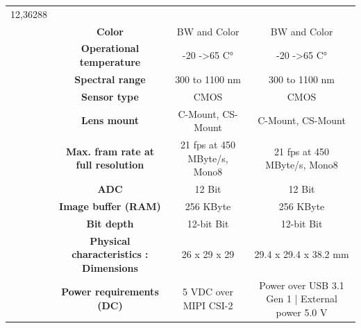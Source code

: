 \begin{table}[H]
{\begin{tabular}{ccc|cc|cc|}
  \multicolumn{2}{c|}{12,36288} \\
\multicolumn{1}{|c|}{} &
  \multicolumn{2}{c|}{\cellcolor[HTML]{EFEFEF}\textbf{Color}} &
  \multicolumn{2}{c|}{\cellcolor[HTML]{EFEFEF}BW and Color} &
  \multicolumn{2}{c|}{\cellcolor[HTML]{EFEFEF}BW and Color} \\
\multicolumn{1}{|c|}{} &
  \multicolumn{2}{c|}{\textbf{Operational temperature}} &
  \multicolumn{2}{c|}{-20 -\textgreater 65 C°} &
  \multicolumn{2}{c|}{-20 -\textgreater 65 C°} \\
\multicolumn{1}{|c|}{} &
  \multicolumn{2}{c|}{\cellcolor[HTML]{EFEFEF}\textbf{Spectral range}} &
  \multicolumn{2}{c|}{\cellcolor[HTML]{EFEFEF}300 to 1100 nm} &
  \multicolumn{2}{c|}{\cellcolor[HTML]{EFEFEF}300 to 1100 nm} \\
\multicolumn{1}{|c|}{} &
  \multicolumn{2}{c|}{\textbf{Sensor type}} &
  \multicolumn{2}{c|}{CMOS} &
  \multicolumn{2}{c|}{CMOS} \\
\multicolumn{1}{|c|}{} &
  \multicolumn{2}{c|}{\cellcolor[HTML]{EFEFEF}\textbf{Lens mount}} &
  \multicolumn{2}{c|}{\cellcolor[HTML]{EFEFEF}C-Mount, CS-Mount} &
  \multicolumn{2}{c|}{\cellcolor[HTML]{EFEFEF}C-Mount, CS-Mount} \\
\multicolumn{1}{|c|}{} &
  \multicolumn{2}{c|}{\textbf{Max. fram rate at full resolution}} &
  \multicolumn{2}{c|}{21 fps at 450 MByte/s, Mono8} &
  \multicolumn{2}{c|}{21 fps at 450 MByte/s, Mono8} \\
\multicolumn{1}{|c|}{} &
  \multicolumn{2}{c|}{\cellcolor[HTML]{EFEFEF}\textbf{ADC}} &
  \multicolumn{2}{c|}{\cellcolor[HTML]{EFEFEF}12 Bit} &
  \multicolumn{2}{c|}{\cellcolor[HTML]{EFEFEF}12 Bit} \\
\multicolumn{1}{|c|}{} &
  \multicolumn{2}{c|}{\textbf{Image buffer (RAM)}} &
  \multicolumn{2}{c|}{256 KByte} &
  \multicolumn{2}{c|}{256 KByte} \\
\multicolumn{1}{|c|}{} &
  \multicolumn{2}{c|}{\cellcolor[HTML]{EFEFEF}\textbf{Bit depth}} &
  \multicolumn{2}{c|}{\cellcolor[HTML]{EFEFEF}12-bit Bit} &
  \multicolumn{2}{c|}{\cellcolor[HTML]{EFEFEF}12-bit Bit} \\
\multicolumn{1}{|c|}{} &
  \multicolumn{2}{c|}{\textbf{Physical characteristics : Dimensions}} &
  \multicolumn{2}{c|}{26 x 29 x 29} &
  \multicolumn{2}{c|}{29.4 x 29.4 x 38.2 mm} \\
\multicolumn{1}{|c|}{} &
  \multicolumn{2}{c|}{\cellcolor[HTML]{EFEFEF}\textbf{Power requirements (DC)}} &
  \multicolumn{2}{c|}{\cellcolor[HTML]{EFEFEF}5 VDC over MIPI CSI-2} &
  \multicolumn{2}{c|}{\cellcolor[HTML]{EFEFEF}Power over USB 3.1 Gen 1 | External power 5.0 V} \\

\end{tabular}}
\end{table}
